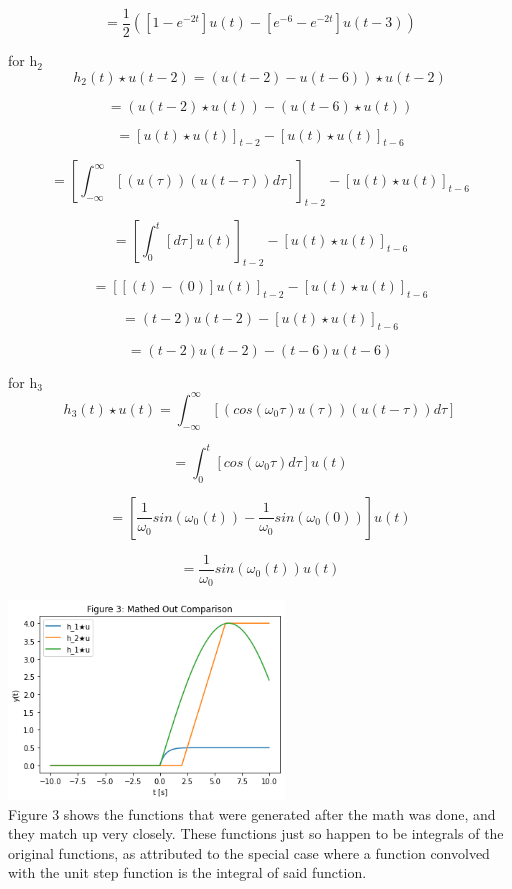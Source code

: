 \documentclass[12pt,a4paper]{article}
\begin{document}
\[ =\frac{1}{2}\left(\left [1-e^{-2t} \right ]u(t)-  \left[e^{-6}-e^{-2t}  \right ]u(t-3) \right)\]

for h$_2$
\[h_2(t) \star u(t-2) = \left (u(t-2)-u(t-6)\right )\star u(t-2)\]

\[ = \left (u(t-2)\star u(t)\right )- \left (u(t-6)\star u(t)\right )\]

\[ = \left [u(t)\star u(t)\right ]_{t-2}- \left [u(t)\star u(t)\right ]_{t-6}\]

\[ = \left [\int_{-\infty}^\infty \left [ \left (u(\tau)\right ) \left (u(t-\tau)\right ) d \tau \right ] \right ]_{t-2}- \left [u(t)\star u(t)\right ]_{t-6}\]

\[ = \left [\int_{0}^t \left [ d \tau \right ] u(t)\right ]_{t-2}- \left [u(t)\star u(t)\right ]_{t-6}\]

\[ = \left [ \left [(t)-(0) \right ] u(t)\right ]_{t-2}- \left [u(t)\star u(t)\right ]_{t-6}\]

\[ = (t-2) u(t-2)- \left [u(t)\star u(t)\right ]_{t-6}\]

\[ = (t-2)u(t-2)-(t-6)u(t-6)\]

for h$_3$
\[h_3(t) \star u(t) =\int_{-\infty}^\infty \left [ \left (cos(\omega_0 \tau)u(\tau)\right ) \left (u(t-\tau)\right ) d \tau \right ]\]

\[ =\int_{0}^t \left [ cos(\omega_0 \tau) d \tau \right ]u(t)\]

\[ =\left [ \frac{1}{\omega_0} sin(\omega_0 (t))-\frac{1}{\omega_0} sin(\omega_0 (0)) \right ]u(t)\]

\[ = \frac{1}{\omega_0} sin(\omega_0 (t))u(t)\]

\includegraphics[width=0.55\textwidth]{Figure3.png}\\
Figure 3 shows the functions that were generated after the math was done, and they match up very closely.  These functions just so happen to be integrals of the original functions, as attributed to the special case where a function convolved with the unit step function is the integral of said function.\\
\end{document}
